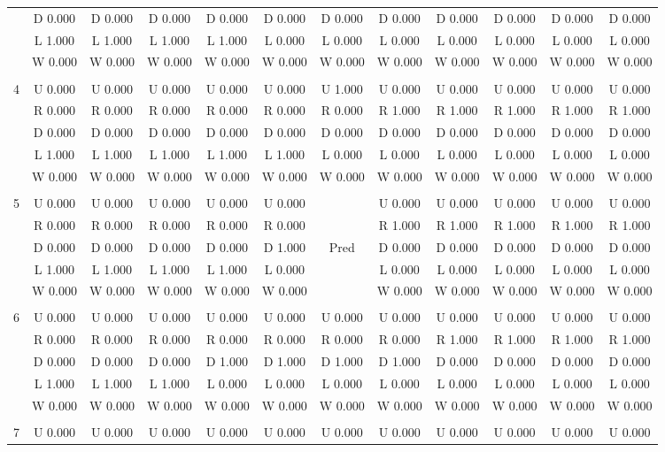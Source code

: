 \begin{table}[htbp]
\begin{tiny}
\begin{tabular}{c|c|c|c|c|c|c|c|c|c|c|c|}
&D 0.000&D 0.000&D 0.000&D 0.000&D 0.000&D 0.000&D 0.000&D 0.000&D 0.000&D 0.000&D 0.000\\
&L 1.000&L 1.000&L 1.000&L 1.000&L 0.000&L 0.000&L 0.000&L 0.000&L 0.000&L 0.000&L 0.000\\
&W 0.000&W 0.000&W 0.000&W 0.000&W 0.000&W 0.000&W 0.000&W 0.000&W 0.000&W 0.000&W 0.000\\
\hline \\
4&U 0.000&U 0.000&U 0.000&U 0.000&U 0.000&U 1.000&U 0.000&U 0.000&U 0.000&U 0.000&U 0.000\\
&R 0.000&R 0.000&R 0.000&R 0.000&R 0.000&R 0.000&R 1.000&R 1.000&R 1.000&R 1.000&R 1.000\\
&D 0.000&D 0.000&D 0.000&D 0.000&D 0.000&D 0.000&D 0.000&D 0.000&D 0.000&D 0.000&D 0.000\\
&L 1.000&L 1.000&L 1.000&L 1.000&L 1.000&L 0.000&L 0.000&L 0.000&L 0.000&L 0.000&L 0.000\\
&W 0.000&W 0.000&W 0.000&W 0.000&W 0.000&W 0.000&W 0.000&W 0.000&W 0.000&W 0.000&W 0.000\\
\hline \\
5&U 0.000&U 0.000&U 0.000&U 0.000&U 0.000&&U 0.000&U 0.000&U 0.000&U 0.000&U 0.000\\
&R 0.000&R 0.000&R 0.000&R 0.000&R 0.000&&R 1.000&R 1.000&R 1.000&R 1.000&R 1.000\\
&D 0.000&D 0.000&D 0.000&D 0.000&D 1.000&Pred&D 0.000&D 0.000&D 0.000&D 0.000&D 0.000\\
&L 1.000&L 1.000&L 1.000&L 1.000&L 0.000&&L 0.000&L 0.000&L 0.000&L 0.000&L 0.000\\
&W 0.000&W 0.000&W 0.000&W 0.000&W 0.000&&W 0.000&W 0.000&W 0.000&W 0.000&W 0.000\\
\hline \\
6&U 0.000&U 0.000&U 0.000&U 0.000&U 0.000&U 0.000&U 0.000&U 0.000&U 0.000&U 0.000&U 0.000\\
&R 0.000&R 0.000&R 0.000&R 0.000&R 0.000&R 0.000&R 0.000&R 1.000&R 1.000&R 1.000&R 1.000\\
&D 0.000&D 0.000&D 0.000&D 1.000&D 1.000&D 1.000&D 1.000&D 0.000&D 0.000&D 0.000&D 0.000\\
&L 1.000&L 1.000&L 1.000&L 0.000&L 0.000&L 0.000&L 0.000&L 0.000&L 0.000&L 0.000&L 0.000\\
&W 0.000&W 0.000&W 0.000&W 0.000&W 0.000&W 0.000&W 0.000&W 0.000&W 0.000&W 0.000&W 0.000\\
\hline \\
7&U 0.000&U 0.000&U 0.000&U 0.000&U 0.000&U 0.000&U 0.000&U 0.000&U 0.000&U 0.000&U 0.000\\

\end{tabular}
\end{tiny}
\end{table}
